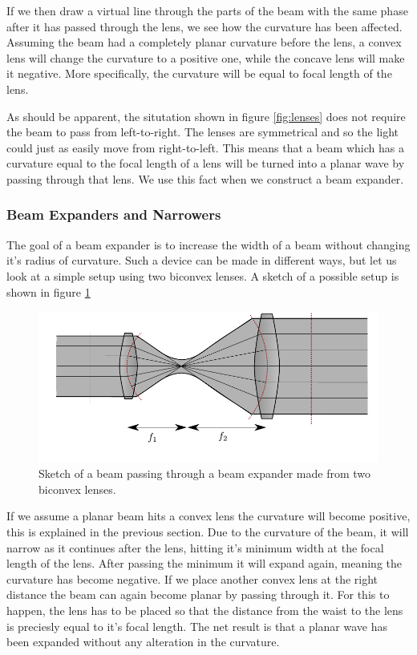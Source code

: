 \documentclass[a4paper, 11pt, notitlepage, english]{article}
\begin{document}
If we then draw a virtual line through the parts of the beam with the same phase after it has passed through the lens, we see how the curvature has been affected. Assuming the beam had a completely planar curvature before the lens, a convex lens will change the curvature to a positive one, while the concave lens will make it negative. More specifically, the curvature will be equal to focal length of the lens.

As should be apparent, the situtation shown in figure \ref{fig:lenses} does not require the beam to pass from left-to-right. The lenses are symmetrical and so the light could just as easily move from right-to-left. This means that a beam which has a curvature equal to the focal length of a lens will be turned into a planar wave by passing through that lens. We use this fact when we construct a beam expander.

\subsubsection{Beam Expanders and Narrowers} \label{sec:beam_expander}

The goal of a beam expander is to increase the width of a beam without changing it's radius of curvature. Such a device can be made in different ways, but let us look at a simple setup using two biconvex lenses. A sketch of a possible setup is shown in figure \ref{fig:beam_expander}

\begin{figure}[htpb]
\includegraphics[width=\textwidth]{beam_expander.pdf}	
\caption{Sketch of a beam passing through a beam expander made from two biconvex lenses. \label{fig:beam_expander}}
\end{figure}

If we assume a planar beam hits a convex lens the curvature will become positive, this is explained in the previous section. Due to the curvature of the beam, it will narrow as it continues after the lens, hitting it's minimum width at the focal length of the lens. After passing the minimum it will expand again, meaning the curvature has become negative. If we place another convex lens at the right distance the beam can again become planar by passing through it. For this to happen, the lens has to be placed so that the distance from the waist to the lens is preciesly equal to it's focal length. The net result is that a planar wave has been expanded without any alteration in the curvature. 
\end{document}
